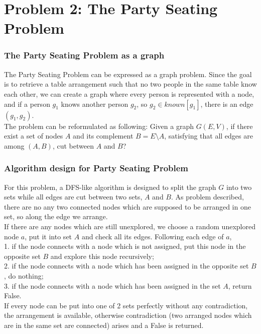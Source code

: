 \documentclass[a4paper,11pt]{article}
\begin{document}
\part{Problem 2: The Party Seating Problem}
\section{The Party Seating Problem as a graph}
The Party Seating Problem can be expressed as a graph problem. Since the goal is to retrieve a table arrangement such that no two people in the same table know each other, we can create a graph where every person is represented with a node, and if a person $g_{1}$ knows another person $g_{2}$, so $g_{2}\in{known[g_{1}]}$, there is an edge $(g_{1},g_{2})$. \\
The problem can be reformulated as following: 
Given a graph $G(E, V)$, if there exist a set of nodes $A$ and its complement $B = E \setminus A$, satisfying that all edges are among $(A, B)$, cut between $A$ and $B$?

\section{Algorithm design for Party Seating Problem}
For this problem, a DFS-like algorithm is designed to split the graph $G$ into two sets while all edges are cut between two sets, $A$ and $B$. As problem described, there are no any two connected nodes which are supposed to be arranged in one set, so along the edge we arrange. \\
If there are any nodes which are still unexplored, we choose a random unexplored node $a$, put it into set $A$ and check all its edges. Following each edge of $a$,\\
1. if the node connects with a node which is not assigned, put this node in the opposite set $B$ and explore this node recursively; \\
2. if the node connects with a node which has been assigned in the opposite set $B$, do nothing; \\
3. if the node connects with a node which has been assigned in the set $A$, return False. \\

If every node can be put into one of 2 sets perfectly without any contradiction, the arrangement is available, otherwise contradiction (two arranged nodes which are in the same set are connected) arises and a False is returned. \\
\end{document}
